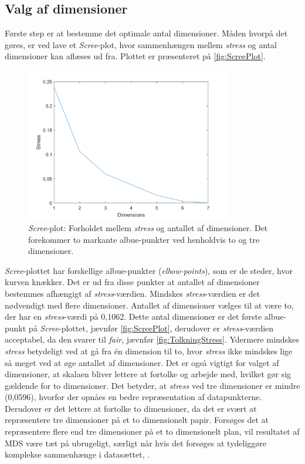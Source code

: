 \subsection*{Valg af dimensioner}
%
Første step er at bestemme det optimale antal dimensioner. Måden hvorpå det gøres, er ved lave et \textit{Scree}-plot, hvor sammenhængen mellem \textit{stress} og antal dimensioner kan aflæses ud fra. Plottet er præsenteret på \autoref{fig:ScreePlot}. 
%
\begin{figure}[H]
\centering
\includegraphics[width = 0.8\textwidth]{Figure/screeplot.png} 
\caption{\textit{Scree}-plot: Forholdet mellem \textit{stress} og antallet af dimensioner. Det forekommer to markante albue-punkter ved henholdvis to og tre dimensioner.}
\label{fig:ScreePlot}
\end{figure}
\noindent
%
\textit{Scree}-plottet har forskellige albue-punkter (\textit{elbow-points}), som er de steder, hvor kurven knækker. Det er ud fra disse punkter at antallet af dimensioner bestemmes afhængigt af \textit{stress}-værdien. Mindskes \textit{stress}-værdien er det nødvendigt med flere dimensioner.\blankline  
%
Antallet af dimensioner vælges til at være to, der har en \textit{stress}-værdi på 0,1062. Dette antal dimensioner er det første albue-punkt på \textit{Scree}-plottet, jævnfør \autoref{fig:ScreePlot}, derudover er \textit{stress}-værdien acceptabel, da den svarer til \textit{fair}, jævnfør \autoref{fig:TolkningStress}. Ydermere mindskes \textit{stress} betydeligt ved at gå fra én dimension til to, hvor \textit{stress} ikke mindskes lige så meget ved at øge antallet af dimensioner. Det er også vigtigt for valget af dimensioner, at skalaen bliver lettere at fortolke og arbejde med, hvilket gør sig gældende for to dimensioner. Det betyder, at \textit{stress} ved tre dimensioner er mindre (0,0596), hvorfor der opnåes en bedre repræsentation af datapunkterne. Derudover er det lettere at fortolke to dimensioner, da det er svært at repræsentere tre dimensioner på et to dimensionelt papir. Forsøges det at repræsentere flere end tre dimensioner på et to dimensionelt plan, vil resultatet af MDS være tæt på ubrugeligt, særligt når hvis det  forsøges at tydeliggøre komplekse sammenhænge i datasættet, \parencite{Borgatti1997}. 

